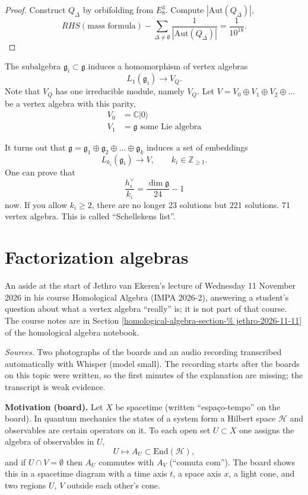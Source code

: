 \begin{proof}
Construct $Q_\Delta$ by orbifolding from
$E_8^3$.
Compute $|\text{Aut}(Q_\Delta)|$,
 $$
RHS(\text{mass formula})-\sum_{\Delta \neq
\emptyset}
\frac{1}{|\text{Aut}(Q_\Delta)|}=\frac{1}
{10^{18}}.
$$
\end{proof}

\medskip\noindent
The subalgebra $\mathfrak{g}_i\subset
\mathfrak{g}$
induces a homomorphism of vertex algebras
$$
L_1(\mathfrak{g}_i) \to V_Q.
$$
Note that $V_Q$ has one irreducible module,
namely $V_Q$.
Let $V=V_0 \oplus V_1 \oplus V_2 \oplus
\ldots$
be a vertex algebra with this parity,
$$
\begin{aligned}
V_0&=\mathbb{C}|0\rangle\\
V_1&=\mathfrak{g}\text{ some Lie algebra}
\end{aligned}
$$

\noindent
It turns out that
$\mathfrak{g}=\mathfrak{g}_1 \oplus
\mathfrak{g}_2
\oplus \ldots \oplus \mathfrak{g}_k$
induces a set of embeddings
$$
L_{k_i}(\mathfrak{g}_i) \to V,\qquad  k_i \in
\mathbb{Z}_{\geq 1}.
$$
One can prove that
$$
\frac{h_i^\vee}{k_i}
=\frac{\dim\mathfrak{g}}{24}-1
$$
now. If you allow $k_i\geq 2$,
there are no longer 23 solutions
but 221 solutions.
71 vertex algebra. This is called
``Schellekens list''.

\section{Factorization algebras}
\label{section-factorization-algebras}

An aside at the start of Jethro van
Ekeren's lecture of Wednesday 11 November
2026 in his course Homological Algebra
(IMPA 2026-2), answering a student's
question about what a vertex algebra
``really'' is; it is not part of that
course. The course notes are in
Section
\ref{homological-algebra-section-%
jethro-2026-11-11}
of the homological algebra notebook.

\textit{Sources.} Two photographs of the
boards and an audio recording transcribed
automatically with Whisper (model small).
The recording starts after the boards on
this topic were written, so the first
minutes of the explanation are missing; the
transcript is weak evidence.

\medskip\noindent
{\bf Motivation (board).} Let $X$ be
spacetime (written ``espaço-tempo'' on the
board). In quantum mechanics the states of a
system form a Hilbert space
$\mathcal{H}$ and observables are certain
operators on it. To each open set
$U\subset X$ one assigns the algebra of
observables in $U$,
$$
U\longmapsto A_U\subset
\mathrm{End}(\mathcal{H}),
$$
and if $U\cap V=\emptyset$ then $A_U$
commutes with $A_V$ (``comuta com''). The
board shows this in a spacetime diagram with
a time axis $t$, a space axis $x$, a light
cone, and two regions $U$, $V$ outside each
other's cone.

